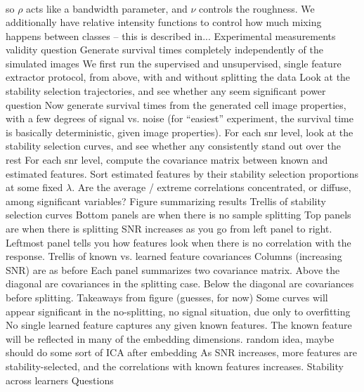 \documentclass[11pt]{article}
\begin{document}
\begin{outline}
\begin{align}
        \end{align}
        so $\rho$ acts like a bandwidth parameter, and $\nu$ controls the
        roughness. We additionally have relative intensity functions to control
        how much mixing happens between classes -- this is described in...
    \2 Experimental measurements
      \3 validity question
        \4 Generate survival times completely independently of the simulated
        images
        \4 We first run the supervised and unsupervised, single feature extractor
        protocol, from above, with and without splitting the data
        \4 Look at the stability selection trajectories, and see whether any
        seem significant
      \3 power question
        \4 Now generate survival times from the generated cell image properties,
        with a few degrees of signal vs. noise (for ``easiest'' experiment, the
        survival time is basically deterministic, given image properties).
        \4 For each snr level, look at the stability selection curves, and see
        whether any consistently stand out over the rest
        \4 For each snr level, compute the covariance matrix between known and
        estimated features. Sort estimated features by their stability selection
        proportions at some fixed $\lambda$. Are the average / extreme
        correlations concentrated, or diffuse, among significant variables?
    \2 Figure summarizing results
      \3 Trellis of stability selection curves
        \4 Bottom panels are when there is no sample splitting
        \4 Top panels are when there is splitting
        \4 SNR increases as you go from left panel to right. Leftmost panel
        tells you how features look when there is no correlation with the
        response.
      \3 Trellis of known vs. learned feature covariances
        \4 Columns (increasing SNR) are as before
        \4 Each panel summarizes two covariance matrix. Above the diagonal are
        covariances in the splitting case. Below the diagonal are covariances
        before splitting.
    \2 Takeaways from figure (guesses, for now)
      \3 Some curves will appear significant in the no-splitting, no signal
      situation, due only to overfitting
      \3 No single learned feature captures any given known features. The known
      feature will be reflected in many of the embedding dimensions.
        \4 random idea, maybe should do some sort of ICA after embedding
      \3 As SNR increases, more features are stability-selected, and the
      correlations with known features increases.
  \1 Stability across learners
    \2 Questions

\end{outline}
\end{document}
